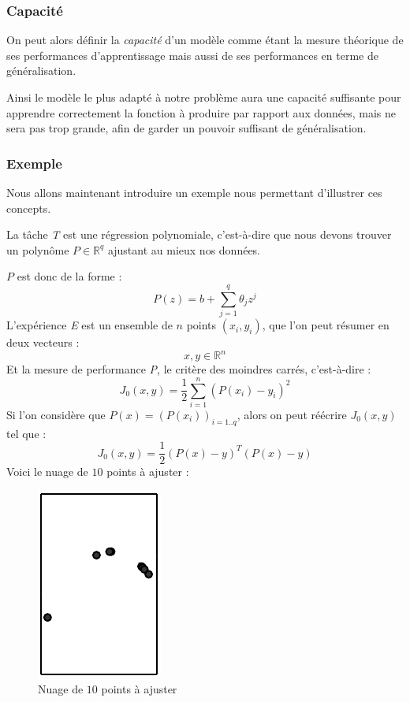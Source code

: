 \documentclass[a4paper, 10pt]{report}
\begin{document}
\subsubsection{Capacité}
On peut alors définir la \emph{capacité} d'un modèle comme étant la mesure théorique de ses performances d'apprentissage mais aussi de ses performances en terme de généralisation.

Ainsi le modèle le plus adapté à notre problème aura une capacité suffisante pour apprendre correctement la fonction à produire par rapport aux données, mais ne sera pas trop grande, afin de garder un pouvoir suffisant de généralisation.
			
\subsubsection{Exemple}
Nous allons maintenant introduire un exemple nous permettant d'illustrer ces concepts.

La tâche \emph{T} est une régression polynomiale, c'est-à-dire que nous devons trouver un polynôme $P \in \mathbb{R}^{q}$ ajustant au mieux nos données.

$P$ est donc de la forme :
$$P(z) = b + \sum_{j=1}^{q}{\theta_j z^j}$$
L'expérience \emph{E} est un ensemble de $n$ points $(x_i,y_i)$, que l'on peut résumer en deux vecteurs :
$$x, y \in \mathbb{R}^n$$
Et la mesure de performance \emph{P}, le critère des moindres carrés, c'est-à-dire :
$$J_0(x,y) =\frac{1}{2} \sum_{i=1}^{n}{(P(x_i)-y_i)^2}$$
Si l'on considère que $P(x) = (P(x_i))_{i=1..q}$, alors on peut réécrire $J_0(x,y)$ tel que :
$$J_0(x,y) = \frac{1}{2} (P(x)-y)^T(P(x)-y)$$
Voici le nuage de $10$ points à ajuster :
\begin{figure}[H]
	\begin{center}
		\includegraphics[scale=0.5]{Images/Fitting_Problem.png}
		\caption{Nuage de $10$ points à ajuster}		
	\end{center}
\end{figure}
			
\end{document}
